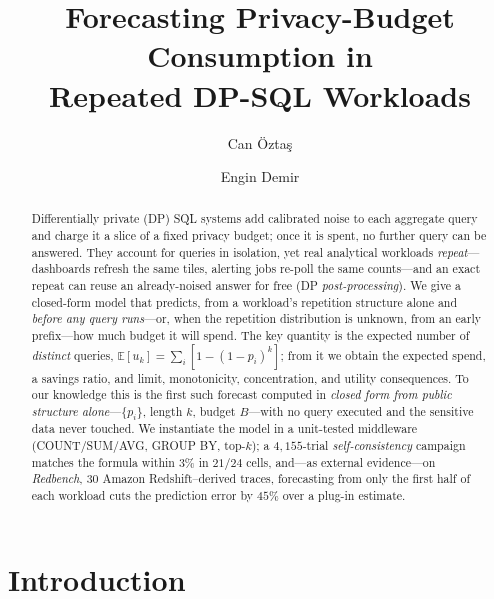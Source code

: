 \documentclass[runningheads]{llncs}
\newcommand{\E}{\mathbb{E}}
\begin{document}
\title{Forecasting Privacy-Budget Consumption in\\ Repeated DP-SQL Workloads}

\author{Can \"Ozta\c{s} \and Engin Demir}

\maketitle

\begin{abstract}
Differentially private (DP) SQL systems add calibrated noise to each aggregate query and charge it a slice of a fixed privacy budget; once it is spent, no further query can be answered. They account for queries in isolation, yet real analytical workloads \emph{repeat}---dashboards refresh the same tiles, alerting jobs re-poll the same counts---and an exact repeat can reuse an already-noised answer for free (DP \emph{post-processing}). We give a closed-form model that predicts, from a workload's repetition structure alone and \emph{before any query runs}---or, when the repetition distribution is unknown, from an early prefix---how much budget it will spend. The key quantity is the expected number of \emph{distinct} queries, $\E[u_k]=\sum_i[1-(1-p_i)^k]$; from it we obtain the expected spend, a savings ratio, and limit, monotonicity, concentration, and utility consequences. To our knowledge this is the first such forecast computed in \emph{closed form from public structure alone}---$\{p_i\}$, length $k$, budget $B$---with no query executed and the sensitive data never touched. We instantiate the model in a unit-tested middleware (COUNT/SUM/AVG, GROUP BY, top-$k$); a $4{,}155$-trial \emph{self-consistency} campaign matches the formula within $3\%$ in $21/24$ cells, and---as external evidence---on \emph{Redbench}, $30$ Amazon Redshift--derived traces, forecasting from only the first half of each workload cuts the prediction error by $45\%$ over a plug-in estimate.
\end{abstract}

\section{Introduction}
\label{sec:intro}
\end{document}
